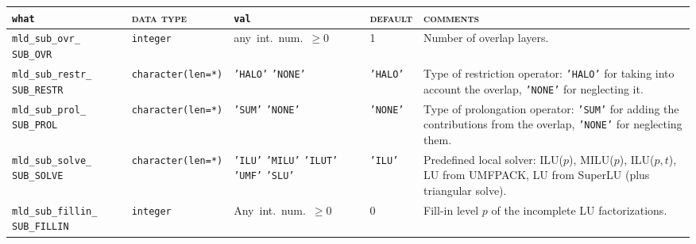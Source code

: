 \bsideways
\begin{center}
\begin{tabular}{|p{3.5cm}|l|p{3.2cm}|l|p{5cm}|}
\hline
\verb|what|              & \textsc{data type}        &  \verb|val|      &  \textsc{default}  &
\textsc{comments} \\ \hline
\verb|mld_sub_ovr_|  \break \verb|SUB_OVR|      & \verb|integer|
                         & any~int.~num.~$\ge 0$
                         & 1
                         & Number of overlap layers. \\ \hline
\verb|mld_sub_restr_|  \break \verb|SUB_RESTR|   & \verb|character(len=*)|
                         & \texttt{'HALO'} \hspace{2.5cm} \texttt{'NONE'}
                         & \texttt{'HALO'}
                         & Type of restriction operator:
                           \texttt{'HALO'} for taking into account the overlap, \texttt{'NONE'} 
                           for neglecting it. \\ \hline
\verb|mld_sub_prol_| \break \verb|SUB_PROL|   & \verb|character(len=*)|
                         & \texttt{'SUM'} \hspace{2.5cm} \texttt{'NONE'}
                         & \texttt{'NONE'}
                         & Type of prolongation operator:
                           \texttt{'SUM'} for adding the contributions from the overlap, \texttt{'NONE'}
                           for neglecting them.   \\ \hline
\verb|mld_sub_solve_| \break \verb|SUB_SOLVE|    & \verb|character(len=*)|
                         & \texttt{'ILU'} \hspace{2.5cm} \texttt{'MILU'} \hspace{2.5cm} \texttt{'ILUT'} 
                           \hspace{2.5cm} \texttt{'UMF'} \hspace{2.5cm} \texttt{'SLU'}
                         & \texttt{'ILU'}
                         & Predefined local solver: ILU($p$),
                         MILU($p$), ILU($p,t$), LU from UMFPACK, LU  from SuperLU 
                           (plus triangular solve). \\ \hline  
\verb|mld_sub_fillin_| \break \verb|SUB_FILLIN|  & \verb|integer|
                         & Any~int.~num.~$\ge 0$
                         & 0
                         & Fill-in level $p$ of the incomplete LU factorizations. \\ \hline

\end{tabular}
\end{center}
